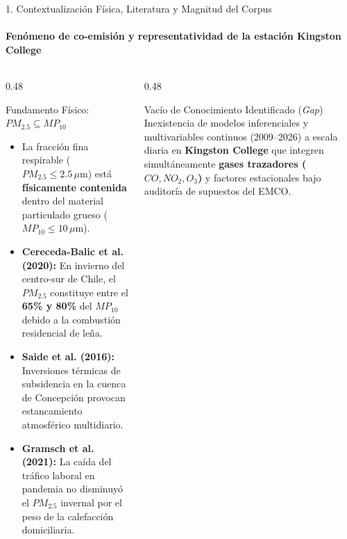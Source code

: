 \documentclass[aspectratio=169, 9pt]{beamer}
\begin{document}
\begin{frame}{1. Contextualización Física, Literatura y Magnitud del Corpus}
\framesubtitle{Fenómeno de co-emisión y representatividad de la estación Kingston College}

\begin{columns}[T]
  \begin{column}{0.48\textwidth}
    \begin{block}{\footnotesize Fundamento Físico: $PM_{2.5} \subseteq MP_{10}$}
      \scriptsize
      \begin{itemize}\setlength{\itemsep}{2.5pt}
        \item La fracción fina respirable ($PM_{2.5} \le 2.5\,\mu\text{m}$) está \textbf{físicamente contenida} dentro del material particulado grueso ($MP_{10} \le 10\,\mu\text{m}$).
        \item \textbf{Cereceda-Balic et al. (2020):} En invierno del centro-sur de Chile, el $PM_{2.5}$ constituye entre el \textbf{65\% y 80\%} del $MP_{10}$ debido a la combustión residencial de leña.
        \item \textbf{Saide et al. (2016):} Inversiones térmicas de subsidencia en la cuenca de Concepción provocan estancamiento atmosférico multidiario.
        \item \textbf{Gramsch et al. (2021):} La caída del tráfico laboral en pandemia no disminuyó el $PM_{2.5}$ invernal por el peso de la calefacción domiciliaria.
      \end{itemize}
    \end{block}
  \end{column}

  \begin{column}{0.48\textwidth}
    \begin{alertblock}{\footnotesize Vacío de Conocimiento Identificado (\textit{Gap})}
      \scriptsize
      Inexistencia de modelos inferenciales y multivariables continuos (2009–2026) a escala diaria en \textbf{Kingston College} que integren simultáneamente \textbf{gases trazadores ($CO, NO_2, O_3$)} y factores estacionales bajo auditoría de supuestos del EMCO.
    \end{alertblock}


\end{column}
\end{columns}
\end{frame}
\end{document}
